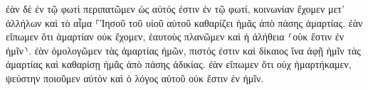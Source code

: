 \documentclass{openreader}
\begin{document}
ἐὰν δὲ ἐν τῷ φωτὶ περιπατῶμεν ὡς αὐτός ἐστιν ἐν τῷ φωτί, κοινωνίαν ἔχομεν μετ’ ἀλλήλων καὶ τὸ αἷμα ⸀Ἰησοῦ τοῦ υἱοῦ αὐτοῦ καθαρίζει ἡμᾶς ἀπὸ πάσης ἁμαρτίας. 
ἐὰν εἴπωμεν ὅτι ἁμαρτίαν οὐκ ἔχομεν, ἑαυτοὺς πλανῶμεν καὶ ἡ ἀλήθεια ⸂οὐκ ἔστιν ἐν ἡμῖν⸃. 
ἐὰν ὁμολογῶμεν τὰς ἁμαρτίας ἡμῶν, πιστός ἐστιν καὶ δίκαιος ἵνα ἀφῇ ἡμῖν τὰς ἁμαρτίας καὶ καθαρίσῃ ἡμᾶς ἀπὸ πάσης ἀδικίας. 
ἐὰν εἴπωμεν ὅτι οὐχ ἡμαρτήκαμεν, ψεύστην ποιοῦμεν αὐτὸν καὶ ὁ λόγος αὐτοῦ οὐκ ἔστιν ἐν ἡμῖν. 
\end{document}
